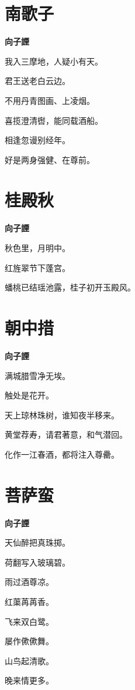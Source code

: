 \documentclass[12pt,a4paper]{ctexbook}
\begin{document}
\section{南歌子}
\textbf{向子諲}\par\vspace{0.5em}
我入三摩地，人疑小有天。\par
君王送老白云边。\par
不用丹青图画、上凌烟。\par
喜揽澄清辔，能同载酒船。\par
相逢忽谩别经年。\par
好是两身强健、在尊前。\par

\section{桂殿秋}
\textbf{向子諲}\par\vspace{0.5em}
秋色里，月明中。\par
红旌翠节下蓬宫。\par
蟠桃已结瑶池露，桂子初开玉殿风。\par

\section{朝中措}
\textbf{向子諲}\par\vspace{0.5em}
满城腊雪净无埃。\par
触处是花开。\par
天上琼林珠树，谁知夜半移来。\par
黄堂荐寿，请君著意，和气潜回。\par
化作一江春酒，都将注入尊罍。\par

\section{菩萨蛮}
\textbf{向子諲}\par\vspace{0.5em}
天仙醉把真珠掷。\par
荷翻写入玻璃碧。\par
雨过酒尊凉。\par
红蕖苒苒香。\par
飞来双白鹭。\par
屡作僛僛舞。\par
山鸟起清歌。\par
晚来情更多。\par
\end{document}
